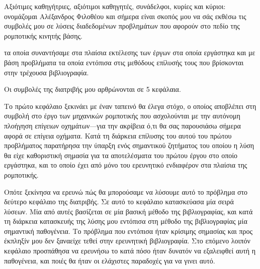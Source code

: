 \documentclass[a4paper,10pt]{article}
\begin{document}
Αξιότιμες καθηγήτριες, αξιότιμοι καθηγητές, συνάδελφοι, κυρίες και κύριοι:
ονομάζομαι Αλέξανδρος Φιλοθέου και σήμερα είναι σκοπός μου να σάς εκθέσω τις
συμβολές μου σε λύσεις διαδεδομένων προβλημάτων που αφορούν στο πεδίο της
ρομποτικής κινητής βάσης.



τα οποία συναντήσαμε στα πλαίσια εκτέλεσης των έργων στα οποία εργάστηκα και με
βάση προβλήματα τα οποία εντόπισα στις μεθόδους επίλυσής τους που βρίσκονται
στην τρέχουσα βιβλιογραφία.

Οι συμβολές της διατριβής μου αρθρώνονται σε 5 κεφάλαια.

Το πρώτο κεφάλαιο ξεκινάει με έναν ταπεινό θα έλεγα στόχο, ο οποίος αποβλέπει
στη συμβολή στο έργο των μηχανικών ρομποτικής που ασχολούνται με την αυτόνομη
πλοήγηση επίγειων οχημάτων---για την ακρίβεια ό,τι θα σας παρουσιάσω σήμερα
αφορά σε επίγεια οχήματα. Κατά τη διάρκεια επίλυσης του αυτού του πρώτου
προβλήματος παρατήρησα την ύπαρξη ενός σημαντικού ζητήματος του οποίου η λύση
θα είχε καθοριστική σημασία για τα αποτελέσματα του πρώτου έργου στο οποίο
εργάστηκα, και το οποίο έχει από μόνο του ερευνητικό ενδιαφέρον στα πλαίσια της
ρομποτικής.

Οπότε ξεκίνησα να ερευνώ πώς θα μπορούσαμε να λύσουμε αυτό το πρόβλημα στο
δεύτερο κεφάλαιο της διατριβής.  Σε αυτό το κεφάλαιο κατασκεύασα μία σειρά
λύσεων. Μία από αυτές βασίζεται σε μία βασική μέθοδο της βιβλιογραφίας, και
κατά τη διάρκεια κατασκευής της λύσης μου εντόπισα στη μέθοδο της βιβλιογραφίας
μία σημαντική παθογένεια. Το πρόβλημα που εντόπισα ήταν κρίσιμης σημασίας και
προς έκπληξίν μου δεν ξαναείχε τεθεί στην ερευνητική βιβλιογραφία.
Στο επόμενο λοιπόν κεφάλαιο προσπάθησα να ερευνήσω το κατά πόσο ήταν
δυνατόν να εξαλειφθεί αυτή η παθογένεια, και ποιές θα ήταν οι ελάχιστες
παραδοχές για να γινει αυτό.
\end{document}
